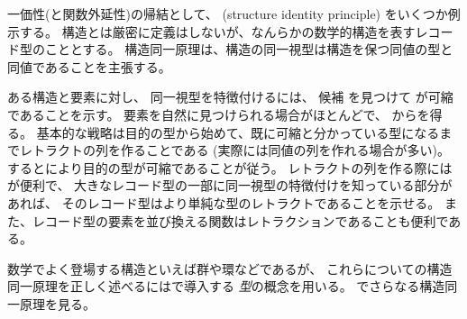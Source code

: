 \documentclass[index]{subfiles}
\begin{document}

一価性(と関数外延性)の帰結として、
(structure identity principle)
をいくつか例示する。
構造とは厳密に定義はしないが、なんらかの数学的構造を表すレコード型のこととする。
構造同一原理は、構造の同一視型は構造を保つ同値の型と同値であることを主張する。

ある構造と要素に対し、
同一視型を特徴付けるには、
候補
を見つけて
が可縮であることを示す。
要素を自然に見つけられる場合がほとんどで、
からを得る。
基本的な戦略は目的の型から始めて、既に可縮と分かっている型になるまでレトラクトの列を作ることである
(実際には同値の列を作れる場合が多い)。
するとにより目的の型が可縮であることが従う。
レトラクトの列を作る際にはが便利で、
大きなレコード型の一部に同一視型の特徴付けを知っている部分があれば、
そのレコード型はより単純な型のレトラクトであることを示せる。
また、レコード型の要素を並び換える関数はレトラクションであることも便利である。





数学でよく登場する構造といえば群や環などであるが、
これらについての構造同一原理を正しく述べるにはで導入する
\emph{型}の概念を用いる。
でさらなる構造同一原理を見る。
\end{document}
